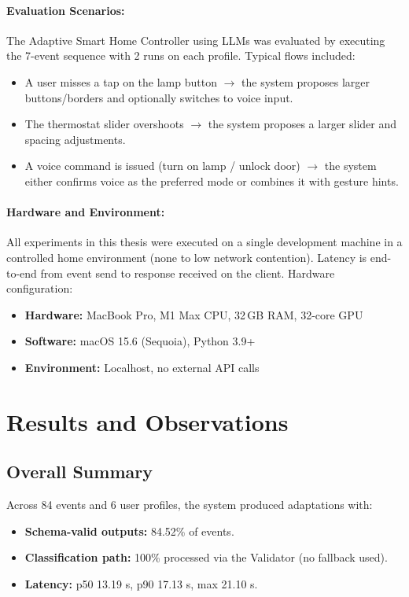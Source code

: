 \documentclass[openany]{book}
\begin{document}
\paragraph{Evaluation Scenarios:}
The Adaptive Smart Home Controller using LLMs was evaluated by executing the 7-event sequence with 2 runs on each profile. Typical flows included:
\begin{itemize}
    \item A user misses a tap on the lamp button $\rightarrow$ the system proposes larger buttons/borders and optionally switches to voice input.
    \item The thermostat slider overshoots $\rightarrow$ the system proposes a larger slider and spacing adjustments.
    \item A voice command is issued (turn on lamp / unlock door) $\rightarrow$ the system either confirms voice as the preferred mode or combines it with gesture hints.
\end{itemize}

\paragraph{Hardware and Environment:}
All experiments in this thesis were executed on a single development machine in a controlled home environment (none to low network contention). Latency is end-to-end from event send to response received on the client.
Hardware configuration:
\begin{itemize}
    \item \textbf{Hardware:} MacBook Pro, M1 Max CPU, 32\,GB RAM, 32-core GPU
    \item \textbf{Software:} macOS 15.6 (Sequoia), Python 3.9+
    \item \textbf{Environment:} Localhost, no external API calls
\end{itemize}
\newpage
\section{Results and Observations}
\subsection{Overall Summary}
Across 84 events and 6 user profiles, the system produced adaptations with:
\begin{itemize}
    \item \textbf{Schema-valid outputs:} 84.52\% of events.
    \item \textbf{Classification path:} 100\% processed via the Validator (no fallback used).
    \item \textbf{Latency:} p50 13.19 s, p90 17.13 s, max 21.10 s.
\end{itemize}
\end{document}
